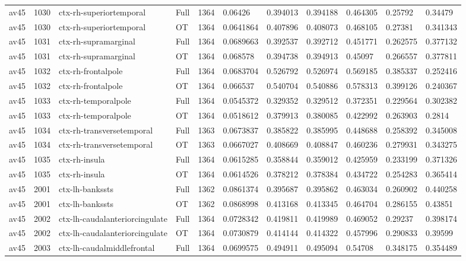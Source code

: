\begin{landscape}
\begin{longtable}{lllllllllll}
av45 & 1030 & ctx-rh-superiortemporal & Full & 1364 & 0.06426 & 0.394013 & 0.394188 & 0.464305 & 0.25792 & 0.34479 \\
av45 & 1030 & ctx-rh-superiortemporal & OT & 1364 & 0.0641864 & 0.407896 & 0.408073 & 0.468105 & 0.27381 & 0.341343 \\
av45 & 1031 & ctx-rh-supramarginal & Full & 1364 & 0.0689663 & 0.392537 & 0.392712 & 0.451771 & 0.262575 & 0.377132 \\
av45 & 1031 & ctx-rh-supramarginal & OT & 1364 & 0.068578 & 0.394738 & 0.394913 & 0.45097 & 0.266557 & 0.377811 \\
av45 & 1032 & ctx-rh-frontalpole & Full & 1364 & 0.0683704 & 0.526792 & 0.526974 & 0.569185 & 0.385337 & 0.252416 \\
av45 & 1032 & ctx-rh-frontalpole & OT & 1364 & 0.066537 & 0.540704 & 0.540886 & 0.578313 & 0.399126 & 0.240367 \\
av45 & 1033 & ctx-rh-temporalpole & Full & 1364 & 0.0545372 & 0.329352 & 0.329512 & 0.372351 & 0.229564 & 0.302382 \\
av45 & 1033 & ctx-rh-temporalpole & OT & 1364 & 0.0518612 & 0.379913 & 0.380085 & 0.422992 & 0.263903 & 0.2814 \\
av45 & 1034 & ctx-rh-transversetemporal & Full & 1363 & 0.0673837 & 0.385822 & 0.385995 & 0.448688 & 0.258392 & 0.345008 \\
av45 & 1034 & ctx-rh-transversetemporal & OT & 1363 & 0.0667027 & 0.408669 & 0.408847 & 0.460236 & 0.279931 & 0.343275 \\
av45 & 1035 & ctx-rh-insula & Full & 1364 & 0.0615285 & 0.358844 & 0.359012 & 0.425959 & 0.233199 & 0.371326 \\
av45 & 1035 & ctx-rh-insula & OT & 1364 & 0.0614526 & 0.378212 & 0.378384 & 0.434722 & 0.254283 & 0.365414 \\
av45 & 2001 & ctx-lh-bankssts & Full & 1362 & 0.0861374 & 0.395687 & 0.395862 & 0.463034 & 0.260902 & 0.440258 \\
av45 & 2001 & ctx-lh-bankssts & OT & 1362 & 0.0868998 & 0.413168 & 0.413345 & 0.464704 & 0.286155 & 0.43851 \\
av45 & 2002 & ctx-lh-caudalanteriorcingulate & Full & 1364 & 0.0728342 & 0.419811 & 0.419989 & 0.469052 & 0.29237 & 0.398174 \\
av45 & 2002 & ctx-lh-caudalanteriorcingulate & OT & 1364 & 0.0730879 & 0.414144 & 0.414322 & 0.457996 & 0.290833 & 0.39599 \\
av45 & 2003 & ctx-lh-caudalmiddlefrontal & Full & 1364 & 0.0699575 & 0.494911 & 0.495094 & 0.54708 & 0.348175 & 0.354489 \\

\end{longtable}
\end{landscape}
